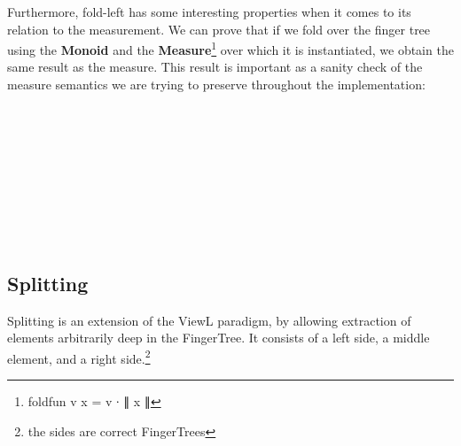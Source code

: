 \documentclass[12pt,twoside,notitlepage]{report}
\begin{document}
Furthermore, fold-left has some interesting properties when it comes to its relation to the measurement. We can prove that if we fold over the finger tree using the \textbf{Monoid} and the \textbf{Measure}\footnote{foldfun v x = v ∙ ∥ x ∥} over which it is instantiated, we obtain the same result as the measure. This result is important as a sanity check of the measure semantics we are trying to preserve throughout the implementation:

\begin{code}
\\
\> \AgdaSymbol{:}  \AgdaSymbol{\{}\AgdaSymbol{\}} \AgdaSymbol{\{} \AgdaSymbol{:}  \AgdaSymbol{\}} \AgdaSymbol{\{} \AgdaSymbol{:}  \AgdaSymbol{\}}\<%
\\
\>[2]\<[14]%
\>[14]  \AgdaSymbol{:}   \<%
\\
\>[2]\<[14]%
\>[14]  \AgdaSymbol{:}    \<%
\\
\>[2]\<[14]%
\>[14] \AgdaSymbol{\{} \AgdaSymbol{:} \AgdaSymbol{\}}\<%
\\
\>[2]\<[14]%
\>[14] \AgdaSymbol{(} \AgdaSymbol{:} \AgdaSymbol{)}\<%
\\
\>[2]\<[14]%
\>[14] \AgdaSymbol{(} \AgdaSymbol{:}    \AgdaSymbol{\{}\AgdaSymbol{\})}\<%
\\
\>[2]\<[14]%
\>[14] \AgdaSymbol{(}       \AgdaSymbol{)}\<%
\\
\end{code}

\subsection{Splitting}

Splitting is an extension of the ViewL paradigm, by allowing extraction of elements arbitrarily deep in the FingerTree. It consists of a left side, a middle element, and a right side.\footnote{the sides are correct FingerTrees}
\end{document}
